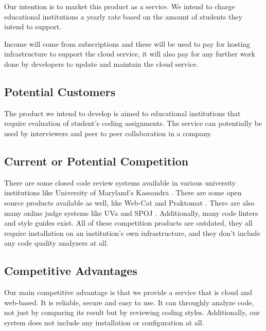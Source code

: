 
Our intention is to market this product as a service. We intend to charge
educational institutions a yearly rate based on the amount of students they
intend to support.

Income will come from subscriptions and these will be used to pay for hosting
infrastructure to support the cloud service, it will also pay for any further
work done by developers to update and maintain the cloud service.

\subsection{Potential Customers}

The product we intend to develop is aimed to educational institutions that
require evaluation of student's coding assignments. The service can potentially
be used by interviewers and peer to peer collaboration in a company.

\subsection{Current or Potential Competition}

There are some closed code review systems available in various university
institutions like University of Maryland's Kassandra \cite{Matt1994}. There are
some open source products available as well, like Web-Cat \cite{WebCat} and
Praktomat \cite{Pracktomat}. There are also many online judge systems like UVa
\cite{UVA} and SPOJ \cite{SPOJ}. Additionally, many code linters and style
guides exist. All of these competition products are outdated, they all require
installation on an institution's own infrastructure, and they don't include any
code quality analyzers at all.

\subsection{Competitive Advantages}

Our main competitive advantage is that we provide a service that is cloud and
web-based. It is reliable, secure and easy to use. It can throughly analyze
code, not just by comparing its result but by reviewing coding styles.
Additionally, our system does not include any installation or configuration at
all.





